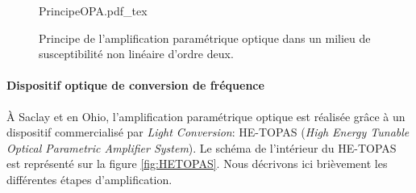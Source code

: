 \begin{figure}
\centering
\def\svgwidth{0.6\columnwidth}
{PrincipeOPA.pdf_tex}
\caption{Principe de l'amplification paramétrique optique dans un milieu de susceptibilité non linéaire d'ordre deux.}
\label{fig:PrincipeOPA}
\end{figure}

\paragraph{Dispositif optique de conversion de fréquence} \`{A} Saclay et en Ohio, l'amplification paramétrique optique est réalisée grâce à un dispositif commercialisé par \textit{Light Conversion}: HE-TOPAS (\textit{High Energy Tunable Optical Parametric Amplifier System}). Le schéma de l'intérieur du HE-TOPAS est représenté sur la figure \ref{fig:HETOPAS}. Nous décrivons ici brièvement les différentes étapes d'amplification.


